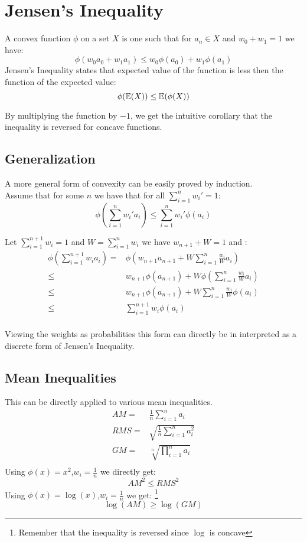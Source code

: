 
\section{Jensen's Inequality}
A convex function $\phi$ on a set $X$ is one such that for $a_n\in X$ and $w_0+w_1 =1$ we have:
\[\phi(w_0a_0+w_1a_1) \leq w_0\phi(a_0)+w_1\phi(a_1)\]
Jensen's Inequality states that expected value of the function is less then the function of the expected value:
\[\phi(\operatorname{\mathbb{E}}(X)) \leq \operatorname{\mathbb{E}}(\phi(X))\]

By multiplying the function by $-1$, we get the intuitive corollary that the inequality is reversed for concave functions.

\subsection{Generalization}
A more general form of convexity can be easily proved by induction.
\\

Assume that for some $n$ we have that for all $\sum_{i=1}^nw_i'=1$:
\[\phi\left(\sum_{i=1}^nw_i'a_i\right) \leq \sum_{i=1}^nw_i'\phi(a_i)\]

Let $\sum_{i=1}^{n+1}w_i=1$ and $W = \sum_{i=1}^nw_i$ we have $w_{n+1}+W = 1$ and :
\begin{equation*}
\begin{aligned}
\phi\left(\sum_{i=1}^{n+1}w_ia_i\right) =&\phi\left(w_{n+1}a_{n+1}+W\sum_{i=1}^{n}\frac{w_i}{W}a_i\right) \\
\leq& w_{n+1}\phi(a_{n+1})+W\phi\left(\sum_{i=1}^{n}\frac{w_i}{W}a_i\right) \\
\leq& w_{n+1}\phi(a_{n+1})+W\sum_{i=1}^n\frac{w_i}{W}\phi(a_i) \\
\leq& \sum_{i=1}^{n+1}w_i\phi(a_i) \\
\end{aligned}
\end{equation*}

Viewing the weights as probabilities this form can directly be in interpreted as a discrete form of Jensen's Inequality.



\subsection{Mean Inequalities}
This can be directly applied to various mean inequalities.
\begin{equation*}
\begin{aligned}
	AM =& \frac{1}{n}\sum_{i=1}^{n}a_i \\
	RMS =& \sqrt{\frac{1}{n}\sum_{i=1}^na_i^2} \\
	GM =& \sqrt[n]{\prod_{i=1}^na_i}\\
\end{aligned}
\end{equation*}
Using $\phi(x)=x^2$,$w_i = \frac{1}{n}$ we directly get:
\[AM^2 \leq RMS^2\]
Using $\phi(x)=\log(x)$,$w_i = \frac{1}{n}$ we get:
\footnote{Remember that the inequality is reversed since $\log$ is concave}
\[\log(AM) \geq \log(GM)\]

